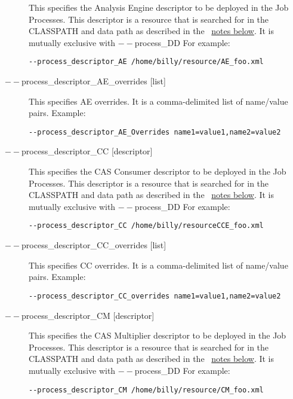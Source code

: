 \begin{description}
             This specifies the Analysis Engine descriptor to be deployed in the Job Processes. This 
             descriptor is a resource that is searched for in the CLASSPATH and data path as described 
             in the ~\hyperref[par:cli.submit.notes]{notes below}.
             It is mutually exclusive with $--$process\_DD For example: 
             \begin{verbatim}
--process_descriptor_AE /home/billy/resource/AE_foo.xml 
             \end{verbatim}


           \item[$--$process\_descriptor\_AE\_overrides {[list]}  ]

             This specifies AE overrides. It is a comma-delimited list of name/value pairs. Example: 
             \begin{verbatim}
--process_descriptor_AE_Overrides name1=value1,name2=value2 
             \end{verbatim}
             
           \item[$--$process\_descriptor\_CC {[descriptor]}  ]

             This specifies the CAS Consumer descriptor to be deployed in the Job Processes. This 
             descriptor is a resource that is searched for in the CLASSPATH and data path as described 
             in the ~\hyperref[par:cli.submit.notes]{notes below}.
             It is mutually exclusive with $--$process\_DD For example: 
             \begin{verbatim}
--process_descriptor_CC /home/billy/resourceCCE_foo.xml 
             \end{verbatim}
             
           \item[$--$process\_descriptor\_CC\_overrides {[list]}  ]

             This specifies CC overrides. It is a comma-delimited list of name/value pairs. Example: 
             \begin{verbatim}
--process_descriptor_CC_overrides name1=value1,name2=value2 
             \end{verbatim}
             
           \item[$--$process\_descriptor\_CM {[descriptor]} ]

             This specifies the CAS Multiplier descriptor to be deployed in the Job Processes. This 
             descriptor is a resource that is searched for in the CLASSPATH and data path as described 
             in the ~\hyperref[par:cli.submit.notes]{notes below}.
             It is mutually exclusive with $--$process\_DD For example: 
             \begin{verbatim}             
--process_descriptor_CM /home/billy/resource/CM_foo.xml 
             \end{verbatim}


\end{description}
